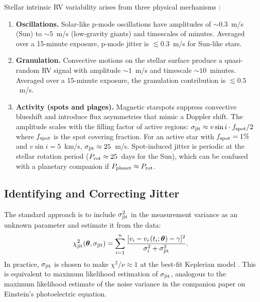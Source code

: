 \documentclass[12pt]{article}
\begin{document}
Stellar intrinsic RV variability arises from three physical mechanisms
\citep{Saar1997}:
\begin{enumerate}
  \item \textbf{Oscillations.}  Solar-like p-mode oscillations have
    amplitudes of $\sim 0.3$~m/s (Sun) to $\sim 5$~m/s (low-gravity
    giants) and timescales of minutes.  Averaged over a 15-minute
    exposure, p-mode jitter is $\lesssim 0.3$~m/s for Sun-like stars.
  \item \textbf{Granulation.}  Convective motions on the stellar
    surface produce a quasi-random RV signal with amplitude $\sim 1$~m/s
    and timescale $\sim 10$~minutes.  Averaged over a 15-minute
    exposure, the granulation contribution is $\lesssim 0.5$~m/s.
  \item \textbf{Activity (spots and plages).}  Magnetic starspots
    suppress convective blueshift and introduce flux asymmetries that
    mimic a Doppler shift.  The amplitude scales with the filling
    factor of active regions: $\sigma_{\rm jit} \approx v\sin i \cdot
    f_{\rm spot}/2$ where $f_{\rm spot}$ is the spot covering fraction.
    For an active star with $f_{\rm spot} = 1\%$ and
    $v\sin i = 5$~km/s, $\sigma_{\rm jit} \approx 25$~m/s.
    Spot-induced jitter is periodic at the stellar rotation period
    ($P_{\rm rot} \approx 25$~days for the Sun), which can be confused
    with a planetary companion if $P_{\rm planet} \approx P_{\rm rot}$.
\end{enumerate}

\subsection{Identifying and Correcting Jitter}

The standard approach is to include $\sigma_{\rm jit}^2$ in the
measurement variance as an unknown parameter and estimate it from the
data:
\begin{equation}\label{eq:chi2_jit}
  \chi^2_{\rm jit}(\boldsymbol\theta, \sigma_{\rm jit}) =
  \sum_{i=1}^n
  \frac{[v_i - v_r(t_i;\boldsymbol\theta) - \gamma]^2}
    {\sigma_i^2 + \sigma_{\rm jit}^2}.
\end{equation}
In practice, $\sigma_{\rm jit}$ is chosen to make $\chi^2/\nu \approx 1$
at the best-fit Keplerian model \citep{Marcy2000}.  This is equivalent
to maximum likelihood estimation of $\sigma_{\rm jit}$, analogous to the
maximum likelihood estimate of the noise variance in the companion paper on
Einstein's photoelectric equation.
\end{document}

